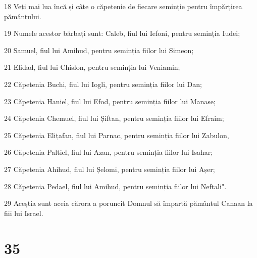 \par 18 Veți mai lua încă și câte o căpetenie de fiecare seminție pentru împărțirea pământului.
\par 19 Numele acestor bărbați sunt: Caleb, fiul lui Iefoni, pentru seminția Iudei;
\par 20 Samuel, fiul lui Amihud, pentru seminția fiilor lui Simeon;
\par 21 Elidad, fiul lui Chislon, pentru seminția lui Veniamin;
\par 22 Căpetenia Buchi, fiul lui Iogli, pentru seminția fiilor lui Dan;
\par 23 Căpetenia Haniel, fiul lui Efod, pentru seminția fiilor lui Manase;
\par 24 Căpetenia Chemuel, fiul lui Șiftan, pentru seminția fiilor lui Efraim;
\par 25 Căpetenia Elițafan, fiul lui Parnac, pentru seminția fiilor lui Zabulon,
\par 26 Căpetenia Paltiel, fiul lui Azan, pentru seminția fiilor lui Isahar;
\par 27 Căpetenia Ahihud, fiul lui Șelomi, pentru seminția fiilor lui Așer;
\par 28 Căpetenia Pedael, fiul lui Amihud, pentru seminția fiilor lui Neftali".
\par 29 Aceștia sunt aceia cărora a poruncit Domnul să împartă pământul Canaan la fiii lui Israel.

\chapter{35}

